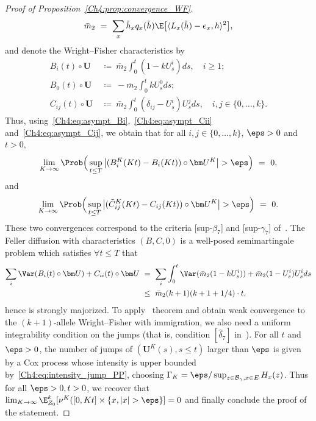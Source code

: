 \begin{refsegment}
\begin{proof}[Proof of Proposition~\ref{Ch4:prop:convergence_WF}]
\[
 \bar m_2\ =\ \sum_{x} \tilde h_x q_x(\tilde h) \E\big[\langle L_x(\tilde h)-e_x, h\rangle^2\big], 
\] 
and denote the Wright--Fisher characteristics by 
\begin{align*}
B_i(t)\circ \bm U \ &\coloneqq\ \bar m_2\int_0^t(1- kU^i_s)ds  ,\quad i\geq 1; \\
B_0(t)\circ \bm U  &\coloneqq\  - \bar m_2\int_0^t kU^0_sds ; \\
 C_{ij}(t)\circ \bm U\ &\coloneqq\ \bar m_2 \int_0^t (\delta_{ij}- U^i_s)U^j_s ds,\quad i,j\in\{0,\ldots, k\}.
\end{align*}
Thus, using~\eqref{Ch4:eq:asympt_Bi},~\eqref{Ch4:eq:asympt_Cii} and~\eqref{Ch4:eq:asympt_Cij}, we obtain that for all $i,j\in\{0, \ldots, k\}$,  $\eps >0$ and $t >0$,
\[
\lim_{K\to\infty }\Prob \Big(\sup_{t\leq T}\big|(B^K_{i}(Kt)-B_{i}(Kt))\circ\bm U^K\big|>\eps \Big)\  =\ 0,
\]
and
\[
\lim_{K\to\infty }\Prob \Big(\sup_{t\leq T}\big|(\tilde C^K_{ij}(Kt)- C_{ij}(Kt))\circ \bm U^K\big|>\eps \Big)\  =\ 0.
\]
These two convergences correspond to the criteria [sup-$\beta_7$] and [sup-$\gamma_7$] of~\citet[Theorem 4.44]{jacod-shiryaev}.
The Feller diffusion with characteristics $(B, C,0)$ is a well-posed semimartingale problem which satisfies $\forall t\leq T$ that
\begin{align*}
  \sum_i \Var(B_i(t)\circ \bm U)+  C_{ii}(t)\circ \bm U\ &=\ \sum_i \int_0^t \Var(\bar m_2(1-k U^i_s))+ \bar m_2(1- U^i_s)U^i_s ds\\
  & \leq\ \bar m_2(k+1)( k+1 + 1/4)\cdot t,
\end{align*}
hence is strongly majorized.
  To apply~\citet[Theorem 4.44]{jacod-shiryaev} theorem and obtain weak convergence to the $(k+1)$-allele Wright--Fisher with immigration, we also need a uniform integrability condition on the jumps (that is, condition $[\hat \delta_7]$ in~\cite{jacod-shiryaev}). For all $t$ and $\eps>0$, the number of jumps of $(\bm U^K(s), s\leq t)$ larger than $\eps$ is given by a Cox process whose intensity is upper bounded by~\eqref{Ch4:eq:intensity_jump_PP}, choosing $\Gamma_K = \eps/\sup_{z\in\mathcal{B}_\gamma, x\in E} H_x(z)$. Thus for all $\eps>0, t>0$, we recover that $\lim_{K\to\infty}\E^k_{Z_0}[\nu^K([0, Kt]\times \{x, |x|>\eps \} ]= 0$ and finally conclude the proof of the statement.
\end{proof}


\end{refsegment}
